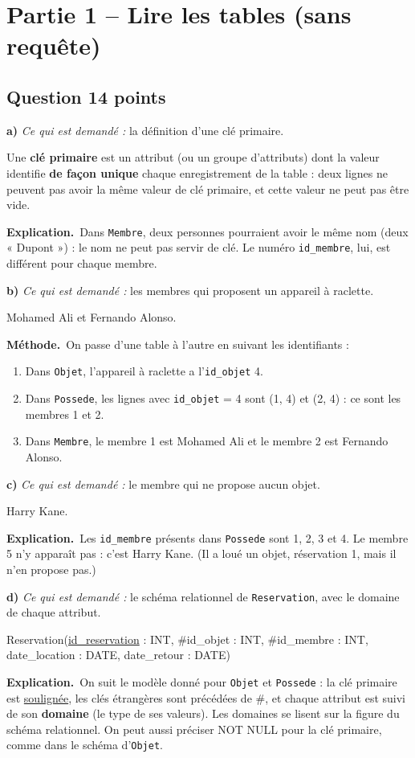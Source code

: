 \documentclass[11pt, a4paper]{exam}
\newcommand{\code}[1]{\texttt{#1}}
\newcommand{\Qt}[2]{\subsection*{#1\hfill{\normalfont\small #2}}}
\newcommand{\rappel}[1]{\noindent\textit{Ce qui est demandé :} #1\par\smallskip}
\newcommand{\methode}{\noindent\textbf{Méthode.}\ }
\newcommand{\explication}{\noindent\textbf{Explication.}\ }
\begin{document}
\section*{Partie 1 -- Lire les tables (sans requête)}
\Qt{Question 1}{4 points}

\textbf{a)} \rappel{la définition d'une clé primaire.}
\begin{reponse}
Une \textbf{clé primaire} est un attribut (ou un groupe d'attributs) dont la valeur identifie \textbf{de façon unique} chaque enregistrement de la table : deux lignes ne peuvent pas avoir la même valeur de clé primaire, et cette valeur ne peut pas être vide.
\end{reponse}
\explication Dans \code{Membre}, deux personnes pourraient avoir le même nom (deux « Dupont ») : le nom ne peut pas servir de clé. Le numéro \code{id\_membre}, lui, est différent pour chaque membre.

\textbf{b)} \rappel{les membres qui proposent un appareil à raclette.}
\begin{reponse}
Mohamed Ali et Fernando Alonso.
\end{reponse}
\methode On passe d'une table à l'autre en suivant les identifiants :
\begin{enumerate}
\item Dans \code{Objet}, l'appareil à raclette a l'\code{id\_objet} 4.
\item Dans \code{Possede}, les lignes avec \code{id\_objet} = 4 sont (1, 4) et (2, 4) : ce sont les membres 1 et 2.
\item Dans \code{Membre}, le membre 1 est Mohamed Ali et le membre 2 est Fernando Alonso.
\end{enumerate}

\textbf{c)} \rappel{le membre qui ne propose aucun objet.}
\begin{reponse}
Harry Kane.
\end{reponse}
\explication Les \code{id\_membre} présents dans \code{Possede} sont 1, 2, 3 et 4. Le membre 5 n'y apparaît pas : c'est Harry Kane. (Il a loué un objet, réservation 1, mais il n'en propose pas.)

\textbf{d)} \rappel{le schéma relationnel de \code{Reservation}, avec le domaine de chaque attribut.}
\begin{reponse}
Reservation(\underline{id\_reservation} : INT, \#id\_objet : INT, \#id\_membre : INT, date\_location : DATE, date\_retour : DATE)
\end{reponse}
\explication On suit le modèle donné pour \code{Objet} et \code{Possede} : la clé primaire est \underline{soulignée}, les clés étrangères sont précédées de \#, et chaque attribut est suivi de son \textbf{domaine} (le type de ses valeurs). Les domaines se lisent sur la figure du schéma relationnel. On peut aussi préciser NOT NULL pour la clé primaire, comme dans le schéma d'\code{Objet}.
\end{document}
